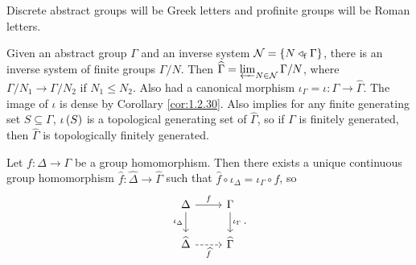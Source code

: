 \begin{notation}
Discrete abstract groups will be Greek letters and profinite groups will be Roman letters.
\end{notation}

Given an abstract group $ \Gamma $ and an inverse system $ \NNN = \cbr{N \triangleleft_\f \Gamma} $, there is an inverse system of finite groups $ \Gamma / N $. Then $ \widehat{\Gamma} = \varprojlim_{N \in \mathcal{N}} \Gamma / N $, where $ \Gamma / N_1 \to \Gamma / N_2 $ if $ N_1 \le N_2 $. Also had a canonical morphism $ \iota_\Gamma = \iota : \Gamma \to \widehat{\Gamma} $. The image of $ \iota $ is dense by Corollary \ref{cor:1.2.30}. Also implies for any finite generating set $ S \subseteq \Gamma $, $ \iota\br{S} $ is a topological generating set of $ \widehat{\Gamma} $, so if $ \Gamma $ is finitely generated, then $ \widehat{\Gamma} $ is topologically finitely generated.

\begin{proposition}
\label{prop:3.1.2}
Let $ f : \Delta \to \Gamma $ be a group homomorphism. Then there exists a unique continuous group homomorphism $ \widehat{f} : \widehat{\Delta} \to \widehat{\Gamma} $ such that $ \widehat{f} \circ \iota_\Delta = \iota_\Gamma \circ f $, so
$$
\begin{tikzcd}
\Delta \arrow{r}{f} \arrow{d}[swap]{\iota_\Delta} & \Gamma \arrow{d}{\iota_\Gamma} \\
\widehat{\Delta} \arrow[dashed]{r}[swap]{\widehat{f}} & \widehat{\Gamma}
\end{tikzcd}.
$$
\end{proposition}

